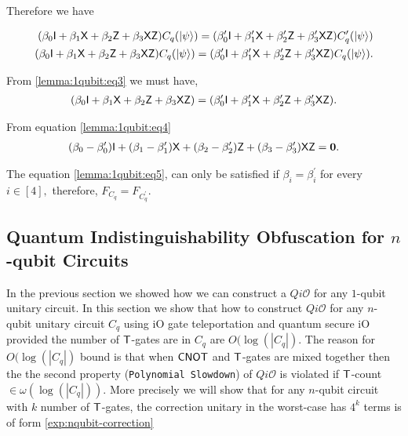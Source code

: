 Therefore we have

\begin{equation}
\label{lemma:1qubit:eq3}
\begin{aligned}
(\beta_0 {\sf I}+\beta_1 {\sf X}+\beta_2 {\sf Z}+\beta_3 {\sf X} {\sf Z})  C_q ({\lvert}\psi\rangle)=(\beta_0^\prime {\sf I}+\beta_1^\prime {\sf X}+\beta_2^\prime {\sf Z}+\beta_3^\prime {\sf X} {\sf Z})  C_q^\prime ({\lvert}\psi\rangle)\\
(\beta_0 {\sf I}+\beta_1 {\sf X}+\beta_2 {\sf Z}+\beta_3 {\sf X} {\sf Z})  C_q ({\lvert}\psi\rangle)=(\beta_0^\prime {\sf I}+\beta_1^\prime {\sf X}+\beta_2^\prime {\sf Z}+\beta_3^\prime {\sf X} {\sf Z})  C_q({\lvert}\psi\rangle).\\
\end{aligned}
\end{equation}


From \ref{lemma:1qubit:eq3} we must have,
\begin{equation}
\label{lemma:1qubit:eq4}
\begin{aligned}
(\beta_0 {\sf I}+\beta_1 {\sf X}+\beta_2 {\sf Z}+\beta_3 {\sf X} {\sf Z}) =(\beta_0^\prime {\sf I}+\beta_1^\prime {\sf X}+\beta_2^\prime {\sf Z}+\beta_3^\prime {\sf X} {\sf Z}).\\
\end{aligned}
\end{equation}

From equation \ref{lemma:1qubit:eq4}
\begin{equation}
\label{lemma:1qubit:eq5}
\begin{aligned}
(\beta_0-\beta_0^\prime) {\sf I}+(\beta_1 -\beta_1^\prime){\sf X}+(\beta_2-\beta_2^\prime) {\sf Z}+(\beta_3-\beta^\prime_3) {\sf X} {\sf Z}={\bf 0}.
\end{aligned}
\end{equation}

The equation \ref{lemma:1qubit:eq5},  can only be satisfied if $\beta_i = \beta_i^\prime$ for every $i\in[4],$ therefore,  $F_{C_q}=F_{C_q^\prime}.$


\subsection{Quantum Indistinguishability Obfuscation for $n$-qubit Circuits}
\label{sec:n-qubit-circuits}
In the previous section we showed how we can construct a $Qi\mathcal{O}$  for any $1$-qubit unitary circuit. In this section we show that how to construct  $Qi\mathcal{O}$ for any $n$-qubit unitary circuit $C_q$ using iO gate teleportation and quantum secure iO provided the number of ${\sf T}$-gates are in $C_q$ are $O(\log(|C_q|).$  The reason for $O(\log(|C_q|)$ bound is that when ${\sf CNOT}$ and ${\sf T}$-gates are mixed together then the
the second property ({\tt Polynomial Slowdown}) of $Qi\mathcal{O}$ is violated if ${\sf T}$-count $\in \omega(\log(|C_q|)).$ More precisely we will show that for any $n$-qubit circuit with $k$ number of ${\sf T}$-gates,  the correction unitary in the worst-case has $4^k$ terms is of form  \ref{exp:nqubit-correction}

